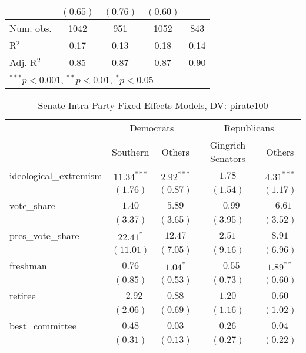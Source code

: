 \documentclass[12pt]{article}
\begin{document}
\begin{table}[H]
\begin{center}
\begin{tabular}{l c c c c }
			& $(0.65)$      & $(0.76)$      & $(0.60)$      &              \\
			\hline
			Num. obs.               & 1042          & 951           & 1052          & 843          \\
			R$^2$      & 0.17          & 0.13          & 0.18          & 0.14         \\
			Adj. R$^2$ & 0.85          & 0.87          & 0.87          & 0.90         \\
			\hline
			\multicolumn{5}{l}{\scriptsize{$^{***}p<0.001$, $^{**}p<0.01$, $^*p<0.05$}}
		\end{tabular}
	\end{center}
\end{table}

\begin{table}[H]
	\begin{center}
		\caption{Senate Intra-Party Fixed Effects Models, DV: pirate100}
		\begin{tabular}{l c c c c }
			\hline
			& \multicolumn{2}{c}{Democrats} & \multicolumn{2}{c}{Republicans} \\
			\cline{2-5}
			& Southern & Others & Gingrich Senators & Others \\
			\hline
			ideological\_extremism  & $11.34^{***}$ & $2.92^{***}$ & $1.78$   & $4.31^{***}$  \\
			& $(1.76)$      & $(0.87)$     & $(1.54)$ & $(1.17)$      \\
			vote\_share             & $1.40$        & $5.89$       & $-0.99$  & $-6.61$       \\
			& $(3.37)$      & $(3.65)$     & $(3.95)$ & $(3.52)$      \\
			pres\_vote\_share       & $22.41^{*}$   & $12.47$      & $2.51$   & $8.91$        \\
			& $(11.01)$     & $(7.05)$     & $(9.16)$ & $(6.96)$      \\
			freshman                & $0.76$        & $1.04^{*}$   & $-0.55$  & $1.89^{**}$   \\
			& $(0.85)$      & $(0.53)$     & $(0.73)$ & $(0.60)$      \\
			retiree                 & $-2.92$       & $0.88$       & $1.20$   & $0.60$        \\
			& $(2.06)$      & $(0.69)$     & $(1.16)$ & $(1.02)$      \\
			best\_committee         & $0.48$        & $0.03$       & $0.26$   & $0.04$        \\
			& $(0.31)$      & $(0.13)$     & $(0.27)$ & $(0.22)$      \\

\end{tabular}
\end{center}
\end{table}
\end{document}
